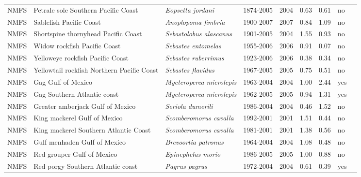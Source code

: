 \begin{longtable}{p{1.8cm}p{4cm}p{4cm}ccccp{1.9cm}c}
  NMFS & Petrale sole Southern Pacific Coast & \textit{Eopsetta jordani} & 1874-2005 & 2004 & 0.63 & 0.61 & no & \cite{NWFSC-PSOLESPCOAST-1874-2005-STANTON} \\ 
  NMFS & Sablefish Pacific Coast & \textit{Anoplopoma fimbria} & 1900-2007 & 2007 & 0.84 & 1.09 & no & \cite{NWFSC-SABLEFPCOAST-1900-2007-BRANCH} \\ 
  NMFS & Shortspine thornyhead Pacific Coast & \textit{Sebastolobus alascanus} & 1901-2005 & 2004 & 1.55 & 0.93 & no & \cite{NWFSC-SSTHORNHPCOAST-1901-2005-STANTON} \\ 
  NMFS & Widow rockfish Pacific Coast & \textit{Sebastes entomelas} & 1955-2006 & 2006 & 0.91 & 0.07 & no & \cite{NWFSC-WROCKPCOAST-1955-2006-BRANCH} \\ 
  NMFS & Yelloweye rockfish Pacific Coast & \textit{Sebastes ruberrimus} & 1923-2006 & 2006 & 0.38 & 0.34 & no & \cite{NWFSC-YEYEROCKPCOAST-1923-2006-BRANCH} \\ 
  NMFS & Yellowtail rockfish Northern Pacific Coast & \textit{Sebastes flavidus} & 1967-2005 & 2005 & 0.75 & 0.51 & no & \cite{NWFSC-YTROCKNPCOAST-1967-2005-STANTON} \\ 
  NMFS & Gag Gulf of Mexico & \textit{Mycteroperca microlepis} & 1963-2004 & 2004 & 1.00 & 2.44 & yes & \cite{SEFSC-GAGGM-1963-2004-JENSEN} \\ 
  NMFS & Gag Southern Atlantic coast & \textit{Mycteroperca microlepis} & 1962-2005 & 2005 & 0.94 & 1.31 & yes & \cite{SEFSC-GAGSATLC-1962-2005-JENSEN} \\ 
  NMFS & Greater amberjack Gulf of Mexico & \textit{Seriola dumerili} & 1986-2004 & 2004 & 0.46 & 1.52 & no & \cite{SEFSC-GRAMBERGM-1986-2004-JENSEN} \\ 
  NMFS & King mackerel Gulf of Mexico & \textit{Scomberomorus cavalla} & 1992-2001 & 2001 & 1.51 & 0.44 & no & \cite{SEFSC-KMACKGM-1992-2001-JENSEN} \\ 
  NMFS & King mackerel Southern Atlantic Coast & \textit{Scomberomorus cavalla} & 1981-2001 & 2001 & 1.38 & 0.56 & no & \cite{SEFSC-KMACKSATLC-1981-2001-JENSEN} \\ 
  NMFS & Gulf menhaden Gulf of Mexico & \textit{Brevoortia patronus} & 1964-2004 & 2004 & 1.08 & 0.48 & no & \cite{SEFSC-MENATGM-1964-2004-GILROY} \\ 
  NMFS & Red grouper Gulf of Mexico & \textit{Epinephelus morio} & 1986-2005 & 2005 & 1.00 & 0.88 & no & \cite{SEFSC-RGROUPGM-1986-2005-JENSEN} \\ 
  NMFS & Red porgy Southern Atlantic coast & \textit{Pagrus pagrus} & 1972-2004 & 2004 & 0.61 & 0.39 & yes & \cite{SEFSC-RPORGYSATLC-1972-2004-JENSEN} \\ 

\end{longtable}
